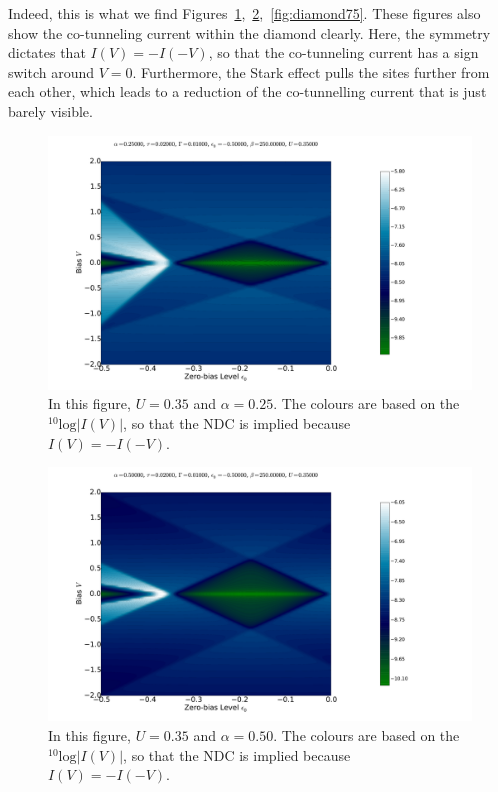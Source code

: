 Indeed, this is what we find Figures~\ref{fig:diamond25},~\ref{fig:diamond50},~\ref{fig:diamond75}. These figures also show the co-tunneling current within the diamond clearly. Here, the symmetry dictates that $I(V)=-I(-V)$, so that the co-tunneling current has a sign switch around $V=0$. Furthermore, the Stark effect pulls the sites further from each other, which leads to a reduction of the co-tunnelling current that is just barely visible.
\begin{figure}[h]
    \centering
    \includegraphics[height=.38\textheight]{pdf/coulombd/current_map_diamond_alpha_025.pdf}
    \caption{In this figure, $U=0.35$ and $\alpha=0.25$. The colours are based on the $^{10}\text{log}\left|I(V)\right|$, so that the NDC is implied because $I(V) = -I(-V)$.}
    \label{fig:diamond25}
\end{figure}
\begin{figure}[h]
    \centering
    \includegraphics[height=.38\textheight]{pdf/coulombd/current_map_diamond_alpha_05.pdf}
    \caption{In this figure, $U=0.35$ and $\alpha=0.50$. The colours are based on the $^{10}\text{log}\left|I(V)\right|$, so that the NDC is implied because $I(V) = -I(-V)$.}
    \label{fig:diamond50}
\end{figure}
